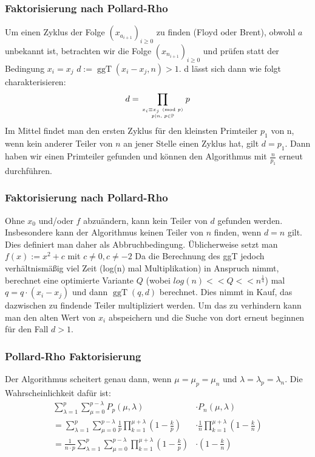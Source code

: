 \documentclass{beamer}
\begin{document}

\begin{frame}
	\frametitle{Faktorisierung nach Pollard-Rho}
	Um einen Zyklus der Folge \((x_{a_{i+1}})_{i \geq 0}\) zu finden (Floyd oder Brent), obwohl \(a\) unbekannt ist, betrachten wir die Folge
	\((x_{n_{i+1}})_{i \geq 0}\) und prüfen statt der Bedingung \(x_i=x_j\) \(d:=\operatorname{ggT}(x_i-x_j,n)>1\).
	d lässt sich dann wie folgt charakterisieren:
	\[
		d=\prod_{x_i \equiv x_j \pmod p \atop p \mid n,\; p \in \mathbb P} p
	\]
	Im Mittel findet man den ersten Zyklus für den kleinsten Primteiler \(p_1\) von n,
	wenn kein anderer Teiler von \(n\) an jener Stelle einen Zyklus hat, gilt \(d=p_1\).
	Dann haben wir einen Primteiler gefunden und können den Algorithmus mit \(\frac{n}{p_1}\) erneut durchführen.
\end{frame}


\begin{frame}
	\frametitle{Faktorisierung nach Pollard-Rho}
	Ohne \(x_0\) und/oder \(f\) abzuändern, kann kein Teiler von \(d\) gefunden werden.
	Insbesondere kann der Algorithmus keinen Teiler von \(n\) finden, wenn \(d=n\) gilt.
	Dies definiert man daher als Abbruchbedingung.
	Üblicherweise setzt man \(f(x):=x^2+c\) mit \(c \neq 0, c \neq -2\)
	Da die Berechnung des ggT jedoch verhältnismäßig viel Zeit (log(n) mal Multiplikation) in Anspruch nimmt, berechnet eine optimierte Variante
	\(Q\) (wobei \(log(n) << Q << n^{\frac{1}{4}}\)) mal
	\(q=q \cdot (x_i - x_j)\) und dann \(\operatorname{ggT}(q,d)\) berechnet.
	Dies nimmt in Kauf, das dazwischen zu findende Teiler multipliziert werden.
	Um das zu verhindern kann man den alten Wert von \(x_i\)
	abspeichern und die Suche von dort erneut beginnen für den Fall \(d>1\).
\end{frame}


\begin{frame}
	\frametitle{Pollard-Rho Faktorisierung}

	Der Algorithmus scheitert genau dann, wenn \( \mu = \mu_p = \mu_n \) und \( \lambda = \lambda_p = \lambda_n \).
	Die Wahrscheinlichkeit dafür ist:
	\begin{align*}
		  \sum_{\lambda=1}^p \sum_{\mu=0}^{p-\lambda} P_p(\mu,\lambda) &\cdot P_n(\mu,\lambda) \\
		= \sum_{\lambda=1}^p \sum_{\mu=0}^{p-\lambda}  \frac{1}{p}\prod_{k=1}^{\mu + \lambda}\left(1-\frac{k}{p}\right) &\cdot
		\frac{1}{n}\prod_{k=1}^{\mu + \lambda}\left(1-\frac{k}{n}\right)\\
		= \frac{1}{n \cdot p} \sum_{\lambda=1}^p \sum_{\mu=0}^{p-\lambda}  \prod_{k=1}^{\mu + \lambda}\left(1-\frac{k}{p}\right) &\cdot
		\left(1-\frac{k}{n}\right)\\
	\end{align*}

\end{frame}
\end{document}
